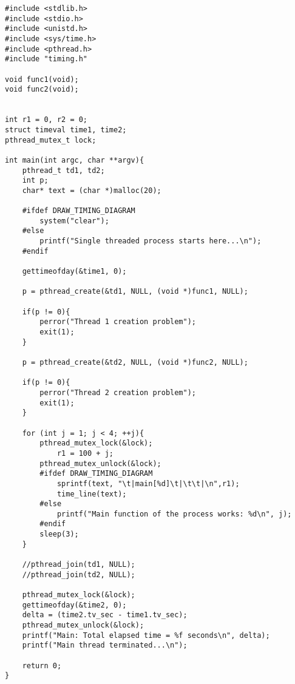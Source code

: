 \documentclass[11pt]{article}
\begin{document}
\begin{minipage}{1\textwidth}
\begin{lstlisting}[title=multithread.c, frame=tlrb, basicstyle=\tiny]
#include <stdlib.h>
#include <stdio.h>
#include <unistd.h>
#include <sys/time.h>
#include <pthread.h>
#include "timing.h"

void func1(void);
void func2(void);


int r1 = 0, r2 = 0;
struct timeval time1, time2;
pthread_mutex_t lock;

int main(int argc, char **argv){
	pthread_t td1, td2;
	int p;
	char* text = (char *)malloc(20);

	#ifdef DRAW_TIMING_DIAGRAM
		system("clear");
	#else
		printf("Single threaded process starts here...\n");
	#endif

	gettimeofday(&time1, 0);
	
	p = pthread_create(&td1, NULL, (void *)func1, NULL);
	
	if(p != 0){
		perror("Thread 1 creation problem");
		exit(1);
	}

	p = pthread_create(&td2, NULL, (void *)func2, NULL);

	if(p != 0){
		perror("Thread 2 creation problem");
		exit(1);
	}

	for (int j = 1; j < 4; ++j){
		pthread_mutex_lock(&lock);
			r1 = 100 + j;
		pthread_mutex_unlock(&lock);
		#ifdef DRAW_TIMING_DIAGRAM
			sprintf(text, "\t|main[%d]\t|\t\t|\n",r1);
			time_line(text);
		#else
			printf("Main function of the process works: %d\n", j);
		#endif
		sleep(3);
	}

	//pthread_join(td1, NULL);
	//pthread_join(td2, NULL);

	pthread_mutex_lock(&lock);
	gettimeofday(&time2, 0);
	delta = (time2.tv_sec - time1.tv_sec);
	pthread_mutex_unlock(&lock);
	printf("Main: Total elapsed time = %f seconds\n", delta);
	printf("Main thread terminated...\n");

	return 0;
}
\end{lstlisting}
\end{minipage}
\newpage
\thispagestyle{empty}
\end{document}
